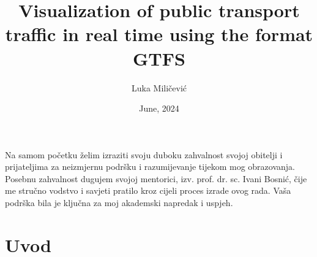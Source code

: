 \documentclass[zavrsnirad]{fer}
\title{Visualization of public transport traffic in real time using the format
	GTFS}
\author{Luka Miličević}
\date{June, 2024}
\begin{document}
\maketitle






\begin{zahvale}
Na samom početku želim izraziti svoju duboku zahvalnost svojoj obitelji i prijateljima za neizmjernu podršku i razumijevanje tijekom mog obrazovanja.
Posebnu zahvalnost dugujem svojoj mentorici, izv. prof. dr. sc. Ivani Bosnić, čije me stručno vodstvo i savjeti pratilo kroz cijeli proces izrade ovog rada. Vaša podrška bila je ključna za moj akademski napredak i uspjeh.
\end{zahvale}


\mainmatter


\tableofcontents


\chapter{Uvod}
\label{pog:uvod}
\end{document}

